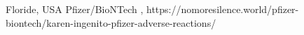           {Floride, USA}
          {}
          {Pfizer/BioNTech}
          {, }
          {
          }
          {https://nomoresilence.world/pfizer-biontech/karen-ingenito-pfizer-adverse-reactions/}


